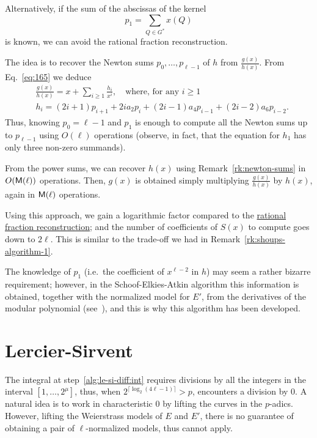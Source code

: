 \begin{remark}
  \label{rk:bmss}
  Alternatively, if the sum of the abscissas of the kernel
  \begin{equation}
    \label{eq:182}
    p_1 = \sum_{Q\in G^\ast}x(Q)
  \end{equation}
  is known, we can avoid the rational fraction reconstruction.

  The idea is to recover the Newton sums $p_0,\ldots,p_{\ell-1}$ of
  $h$ from $\frac{g(x)}{h(x)}$. From Eq.~\eqref{eq:165} we deduce
  \begin{equation}
    \label{eq:181}
    \begin{aligned}
      &\frac{g(x)}{h(x)} = x + \sum_{i\ge1}\frac{h_i}{x^i},
      \quad\text{where, for any $i\ge1$}\\
      &h_i = (2i+1)p_{i+1} + 2ia_2p_i + (2i-1)a_4p_{i-1} + (2i-2)a_6p_{i-2}
      \text{.}
    \end{aligned}
  \end{equation}
  Thus, knowing $p_0=\ell-1$ and $p_1$ is enough to compute all the
  Newton sums up to $p_{\ell-1}$ using $O(\ell)$ operations (observe,
  in fact, that the equation for $h_1$ has only three non-zero
  summands).

  From the power sums, we can recover $h(x)$ using
  Remark~\ref{rk:newton-sums} in $O(\mathsf{M}(\ell))$ operations. Then,
  $g(x)$ is obtained simply multiplying $\frac{g(x)}{h(x)}$ by $h(x)$,
  again in $\mathsf{M}(\ell)$ operations.

  Using this approach, we gain a logarithmic factor compared to the
  \hyperref[sec:eucl-algor-rati]{rational fraction reconstruction};
  and the number of coefficients of $S(x)$ to compute goes down to
  $2\ell$. This is similar to the trade-off we had in
  Remark~\ref{rk:shoups-algorithm-1}.

    The knowledge of $p_1$
  (i.e.\ the coefficient of $x^{\ell-2}$ in $h$) may seem a rather
  bizarre requirement; however, in the Schoof-Elkies-Atkin algorithm
  this information is obtained, together with the normalized model for
  $E'$, from the derivatives of the modular polynomial
  (see~\cite{elkies98,morain95}), and this is why this algorithm has
  been developed.
\end{remark}



\section{Lercier-Sirvent}
\label{sec:lercier-sirvent}
The integral at step~\ref{alg:le-si-diff:int} requires divisions by
all the integers in the interval $[1,\ldots,2^\mu]$, thus, when
$2^{\lceil\log_2(4\ell-1)\rceil}>p$, 
encounters a division by $0$. A natural idea is to work in
characteristic $0$ by lifting the curves in the $p$-adics. However,
lifting the Weierstrass models of $E$ and $E'$, there is no guarantee
of obtaining a pair of $\ell$-normalized models, thus
 cannot apply.

